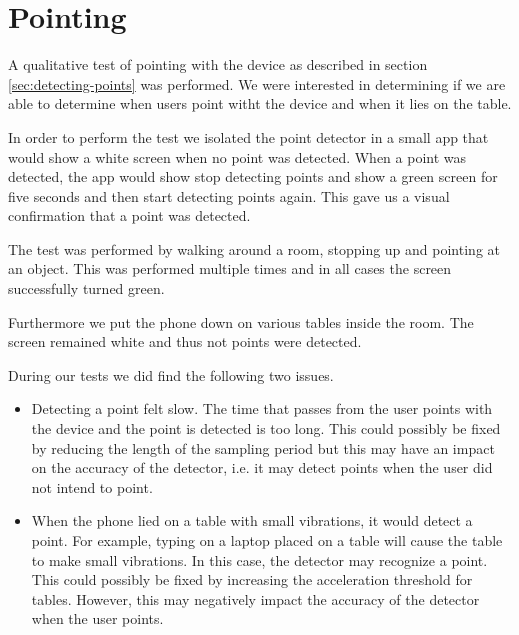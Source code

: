 \section{Pointing}
\label{sec:evaluation:pointing}

A qualitative test of pointing with the device as described in section \ref{sec:detecting-points} was performed. We were interested in determining if we are able to determine when users point witht the device and when it lies on the table.

In order to perform the test we isolated the point detector in a small app that would show a white screen when no point was detected. When a point was detected, the app would show stop detecting points and show a green screen for five seconds and then start detecting points again.
This gave us a visual confirmation that a point was detected.

The test was performed by walking around a room, stopping up and pointing at an object. This was performed multiple times and in all cases the screen successfully turned green.

Furthermore we put the phone down on various tables inside the room. The screen remained white and thus not points were detected.

During our tests we did find the following two issues.

\begin{itemize}
\item Detecting a point felt slow. The time that passes from the user points with the device and the point is detected is too long. This could possibly be fixed by reducing the length of the sampling period but this may have an impact on the accuracy of the detector, i.e. it may detect points when the user did not intend to point.
\item When the phone lied on a table with small vibrations, it would detect a point. For example, typing on a laptop placed on a table will cause the table to make small vibrations. In this case, the detector may recognize a point. This could possibly be fixed by increasing the acceleration threshold for tables. However, this may negatively impact the accuracy of the detector when the user points.
\end{itemize}

